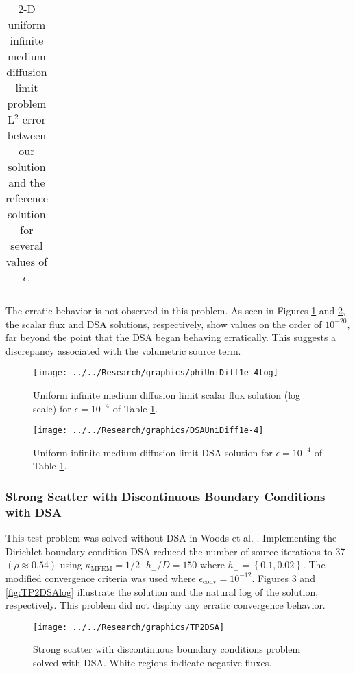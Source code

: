 \documentclass{article}
\begin{document}
\begin{table}[!h]
{\begin{tabular}{|c|c|c|c|c|}
\end{tabular}}
\caption{2-D uniform infinite medium diffusion limit problem L$^2$ error between our solution and the reference solution for several values of $\epsilon$.}
\label{tab:2DuniformDiffErr}
\end{table}

The erratic behavior is not observed in this problem. As seen in Figures \ref{fig:phiUniDiff1e-4log} and \ref{fig:DSAUniDiff1e-4}, the scalar flux and DSA solutions, respectively, show values on the order of $10^{-20}$, far beyond the point that the DSA began behaving erratically. This suggests a discrepancy associated with the volumetric source term.

\begin{figure}[!h]
\texttt{[image: ../../Research/graphics/phiUniDiff1e-4log]}
\caption{Uniform infinite medium diffusion limit scalar flux solution (log scale) for $\epsilon = 10^{-4}$ of Table \ref{tab:2DuniformDiffErr}.}
\label{fig:phiUniDiff1e-4log}
\end{figure}

\begin{figure}[!h]
\texttt{[image: ../../Research/graphics/DSAUniDiff1e-4]}
\caption{Uniform infinite medium diffusion limit DSA solution for $\epsilon = 10^{-4}$ of Table \ref{tab:2DuniformDiffErr}.}
\label{fig:DSAUniDiff1e-4}
\end{figure}

\FloatBarrier

\subsubsection{Strong Scatter with Discontinuous Boundary Conditions with DSA}

This test problem was solved without DSA in Woods et al. \cite{WoodsHoDgfemXyCurved}. Implementing the Dirichlet boundary condition DSA reduced the number of source iterations to 37 $\left(\rho \approx 0.54 \right)$ using $\kappa_\text{MFEM} = 1/2 \cdot h_\perp / D = 150$ where $h_\perp = \left\{0.1, 0.02 \right\}$.  The modified convergence criteria was used where $\epsilon_\text{conv} = 10^{-12}$. Figures \ref{fig:TP2DSA} and \ref{fig:TP2DSAlog} illustrate the solution and the natural log of the solution, respectively. This problem did not display any erratic convergence behavior.

\begin{figure}[!h]
\centering
\texttt{[image: ../../Research/graphics/TP2DSA]}
\caption{Strong scatter with discontinuous boundary conditions problem solved with DSA. White regions indicate negative fluxes.}
\label{fig:TP2DSA}
\end{figure}
\end{document}
